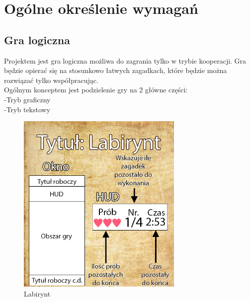 	\newpage
\section{Ogólne określenie wymagań}		%















\subsection{Gra logiczna}  %

\hspace{0.60cm}Projektem jest gra logiczna możliwa do zagrania tylko w trybie kooperacji. Gra będzie opierać się na stosunkowo łatwych zagadkach, które będzie można rozwiązać tylko współpracując.
\\Ogólnym konceptem jest podzielenie gry na 2 główne części:
\\\hspace{0.60cm}-Tryb graficzny
\\\hspace{0.60cm}-Tryb tekstowy


%

	\begin{figure}[!htb]
	\begin{center}
		\includegraphics[width=8cm]{rys/gra1.png}
		\caption{Labirynt}
		\label{rys:rysunek001}
	\end{center}
\end{figure}

